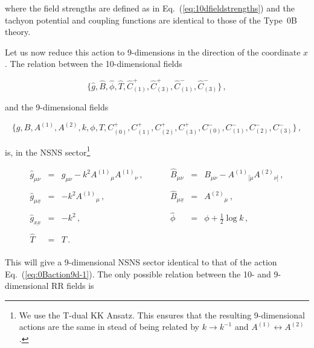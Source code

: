 \documentclass[12pt,a4paper]{article}
\begin{document}
\noindent where the field strengths are defined as in 
Eq.~(\ref{eq:10dfieldstrengths}) and the tachyon potential and 
coupling functions are identical to those of the Type~0B theory.

Let us now reduce this action to 9-dimensions in the direction of the
coordinate $x$. The relation between the 10-dimensional fields

\begin{equation}
\{\hat{g},
\hat{B},\hat{\phi},\hat{T}, 
\hat{C}^{+}_{(1)},\hat{C}^{+}_{(3)},
\hat{C}^{-}_{(1)},\hat{C}^{-}_{(3)}\}\, ,
\end{equation}

\noindent and the 9-dimensional fields 

\begin{equation}
\{g,B,A^{(1)},A^{(2)},k,\phi,T,
C^{+}_{(0)},C^{+}_{(1)},C^{+}_{(2)},C^{+}_{(3)},
C^{-}_{(0)},C^{-}_{(1)},C^{-}_{(2)},C^{-}_{(3)}\}\, ,  
\end{equation}

\noindent is, in the NSNS sector\footnote{We use the T-dual KK Ansatz. This
ensures that the resulting 9-dimensional actions are the same in stead
of being related by $k\rightarrow k^{-1}$ and 
$A^{(1)}\leftrightarrow A^{(2)}$.}

\begin{equation}
\begin{array}{rclrcl}
\hat{g}_{\mu\nu} & = & g_{\mu\nu}-k^{2}A^{(1)}{}_{\mu}A^{(1)}{}_{\nu}\, ,
\hspace{1cm}&
\hat{B}_{\mu\nu} & = & B_{\mu\nu}-A^{(1)}{}_{[\mu}A^{(2)}{}_{\nu]}\, ,
\\
& & & & &
\\
\hat{g}_{\mu\underline{x}} & = & -k^{2}A^{(1)}{}_{\mu}\, , &
\hat{B}_{\mu\underline{x}} & = & A^{(2)}{}_{\mu}\, ,
\\
& & & & &
\\
\hat{g}_{\underline{xx}} & = & -k^{2}\, , &
\hat{\phi}               & = & \phi +\frac{1}{2}\log{k}\, ,
\\
& & & & &
\\
\hat{T} & = & T\, .& & & \\
\end{array}
\label{eq:9dNSNS0A}
\end{equation}

\noindent This will give a 9-dimensional NSNS sector identical to that
of the action Eq.~(\ref{eq:0Baction9d-1}). The only possible relation
between the 10- and 9-dimensional RR fields is
\end{document}

